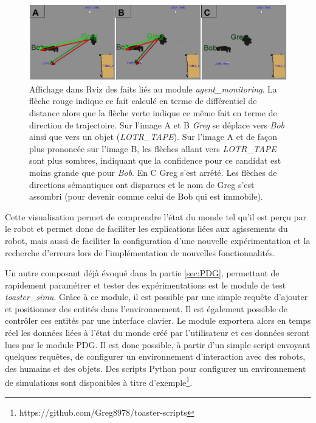 \documentclass[a4paper,11pt,twoside]{StyleThese}
\begin{document}
\begin{figure}[ht!]
 \centering
  \includegraphics[width=1.0\linewidth]{./img/movingToward.jpg} 
  \caption {Affichage dans Rviz des faits liés au module \textit{agent\_monitoring}. La flèche rouge indique ce fait calculé en terme de différentiel de distance alors que la flèche verte indique ce même fait en terme de direction de trajectoire. Sur l'image A et B \textit{Greg} se déplace vers \textit{Bob} ainsi que vers un objet (\textit{LOTR\_TAPE}). Sur l'image A et de façon plus prononcée sur l'image B, les flèches allant vers \textit{LOTR\_TAPE} sont plus sombres, indiquant que la confidence pour ce candidat est moins grande que pour \textit{Bob}. En C Greg s'est arrêté. Les flèches de directions sémantiques ont disparues et le nom de Greg s'est assombri (pour devenir comme celui de Bob qui est immobile).}
  \label{fig:moving}
\end{figure}

Cette visualisation permet de comprendre l'état du monde tel qu'il est perçu par le robot et permet donc de faciliter les explications liées aux agissements du robot, mais aussi de faciliter la configuration d'une nouvelle expérimentation et la recherche d'erreurs lors de l'implémentation de nouvelles fonctionnalités. 


Un autre composant déjà évoqué dans la partie \ref{sec:PDG}, permettant de rapidement paramétrer et tester des expérimentations est le module de test \textit{toaster\_simu}. Grâce à ce module, il est possible par une simple requête d'ajouter et positionner des entités dans l'environnement. Il est également possible de contrôler ces entités par une interface clavier. Le module exportera alors en temps réel les données liées à l'état du monde créé par l'utilisateur et ces données seront lues par le module PDG. Il est donc possible, à partir d'un simple script envoyant quelques requêtes, de configurer un environnement d'interaction avec des robots, des humains et des objets. Des scripts Python pour configurer un environnement de simulations sont disponibles à titre d'exemple\footnote{https://github.com/Greg8978/toaster-scripts}.
\end{document}

